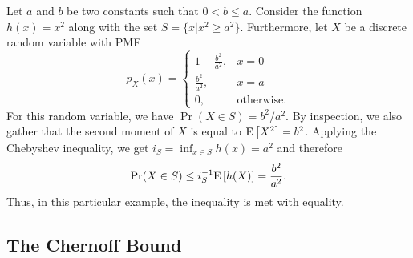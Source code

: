 \begin{example}
Let $a$ and $b$ be two constants such that $0 < b \leq a$.
Consider the function $h(x) = x^2$ along with the set $S = \{ x | x^2 \geq a^2 \}$.
Furthermore, let $X$ be a discrete random variable with PMF
\begin{equation*}
p_X (x) = \left\{ \begin{array}{ll} 1 - \frac{b^2}{a^2}, & x = 0 \\
\frac{b^2}{a^2}, & x = a \\
0, & \text{otherwise.} \end{array} \right.
\end{equation*}
For this random variable, we have $\Pr (X \in S) = b^2/a^2$.
By inspection, we also gather that the second moment of $X$ is equal to $\mathrm{E} \left[ X^2 \right] = b^2$.
Applying the Chebyshev inequality, we get $i_S = \inf_{x \in S} h(x) = a^2$ and therefore
\begin{equation*}
\Pr (X \in S) \leq i_S^{-1} \mathrm{E} \left[ h(X) \right]
= \frac{b^2}{a^2} .
\end{equation*}
Thus, in this particular example, the inequality is met with equality.
\end{example}


\subsection{The Chernoff Bound}

